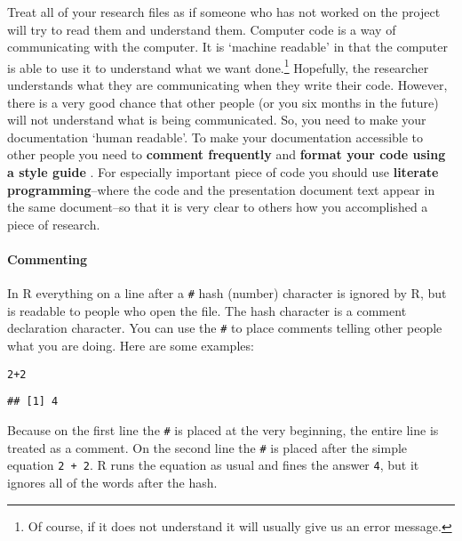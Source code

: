 Treat all of your research files as if someone who has not worked on the project will try to read them and understand them. Computer code is a way of communicating with the computer. It is `machine readable' in that the computer is able to use it to understand what we want done.\footnote{Of course, if it does not understand it will usually give us an error message.} Hopefully, the researcher understands what they are communicating when they write their code. However, there is a very good chance that other people (or you six months in the future) will not understand what is being communicated. So, you need to make your documentation `human readable'. To make your documentation accessible to other people you need to {\bf{comment frequently}} \cite[3]{Bowers2011} and {\bf{format your code using a style guide}} \cite[]{Nagler1995}. For especially important piece of code you should use {\bf{literate programming}}--where the code and the presentation document text appear in the same document--so that it is very clear to others how you accomplished a piece of research.

\paragraph{Commenting}
In R everything on a line after a {\tt{\#}} hash (number) character is ignored by R, but is readable to people who open the file. The hash character is a comment declaration character. You can use the {\tt{\#}} to place comments telling other people what you are doing. Here are some examples:

\begin{knitrout}
\color{fgcolor}\begin{kframe}
\begin{alltt}
2 + 2  
\end{alltt}
\begin{verbatim}
## [1] 4
\end{verbatim}
\end{kframe}
\end{knitrout}


Because on the first line the {\tt{\#}} is placed at the very beginning, the entire line is treated as a comment. On the second line the {\tt{\#}} is placed after the simple equation {\tt{2 + 2}}. R runs the equation as usual and fines the answer {\tt{4}}, but it ignores all of the words after the hash. 

